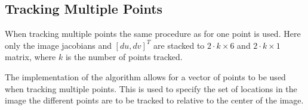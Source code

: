 \subsection{Tracking Multiple Points}

When tracking multiple points the same procedure as for one point is used.
Here only the image jacobians and $[du, dv]^T$ are stacked to $2 \cdot k \times 6$ and $2 \cdot k \times 1$ matrix, where $k$ is the number of points tracked.

The implementation of the algorithm allows for a vector of points to be used when tracking multiple points.
This is used to specify the set of locations in the image the different points are to be tracked to relative to the center of the image.

